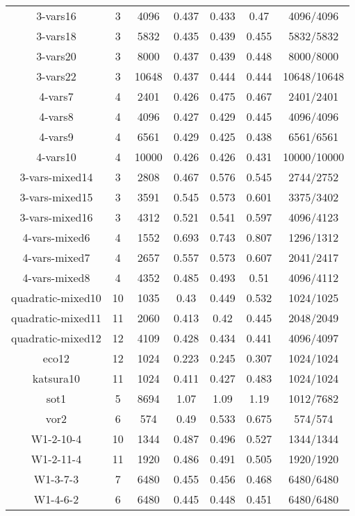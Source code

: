 \documentclass[12pt]{article}
\begin{document}
\begin{tabular}{c|c|c|c|c|c|c}
3-vars16&3 &4096&0.437&0.433&0.47&4096/4096\\
3-vars18&3 &5832&0.435&0.439&0.455&5832/5832\\
3-vars20&3 &8000&0.437&0.439&0.448&8000/8000\\
3-vars22&3 &10648&0.437&0.444&0.444&10648/10648\\
4-vars7&4 &2401&0.426&0.475&0.467&2401/2401\\
4-vars8&4 &4096&0.427&0.429&0.445&4096/4096\\
4-vars9&4 &6561&0.429&0.425&0.438&6561/6561\\
4-vars10&4 &10000&0.426&0.426&0.431&10000/10000\\

3-vars-mixed14&3 &2808&0.467&0.576&0.545& 2744/2752\\
3-vars-mixed15&3 &3591&0.545&0.573&0.601& 3375/3402\\
3-vars-mixed16&3 &4312&0.521&0.541&0.597& 4096/4123\\
4-vars-mixed6&4 &1552&0.693&0.743&0.807& 1296/1312\\
4-vars-mixed7&4 &2657&0.557&0.573&0.607& 2041/2417\\
4-vars-mixed8&4 &4352&0.485&0.493&0.51& 4096/4112\\
quadratic-mixed10&10 &1035&0.43&0.449&0.532& 1024/1025\\
quadratic-mixed11&11 &2060&0.413&0.42&0.445& 2048/2049\\
quadratic-mixed12&12 &4109&0.428&0.434&0.441& 4096/4097\\

eco12&12 &1024&0.223&0.245&0.307&1024/1024\\
katsura10&11 &1024&0.411&0.427&0.483&1024/1024\\
sot1&5 &8694&1.07&1.09&1.19 & 1012/7682\\
vor2&6 &574&0.49&0.533&0.675&574/574\\
W1-2-10-4&10 &1344&0.487&0.496&0.527&1344/1344\\
W1-2-11-4&11 &1920&0.486&0.491&0.505&1920/1920\\
W1-3-7-3&7 &6480&0.455&0.456&0.468&6480/6480\\
W1-4-6-2&6 &6480&0.445&0.448&0.451&6480/6480\\

	
\end{tabular}

\newpage


\end{document}
